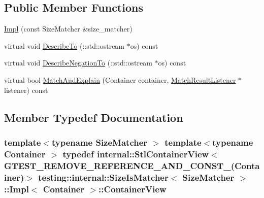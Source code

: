 \subsection*{Public Member Functions}
\begin{DoxyCompactItemize}
\item 
\hyperlink{classtesting_1_1internal_1_1_size_is_matcher_1_1_impl_aa5279c8598ec8982546350fb442223f3}{Impl} (const Size\+Matcher \&size\+\_\+matcher)
\item 
virtual void \hyperlink{classtesting_1_1internal_1_1_size_is_matcher_1_1_impl_a2d09318bced4fd9adf951009d81a97ff}{Describe\+To} (\+::std\+::ostream $\ast$os) const 
\item 
virtual void \hyperlink{classtesting_1_1internal_1_1_size_is_matcher_1_1_impl_adb77690cb058ea5e2f56bb1ddcba0289}{Describe\+Negation\+To} (\+::std\+::ostream $\ast$os) const 
\item 
virtual bool \hyperlink{classtesting_1_1internal_1_1_size_is_matcher_1_1_impl_ae68cb5cb21f7c2c0026b1afdf7e74ebf}{Match\+And\+Explain} (Container container, \hyperlink{classtesting_1_1_match_result_listener}{Match\+Result\+Listener} $\ast$listener) const 
\end{DoxyCompactItemize}


\subsection{Member Typedef Documentation}
\subsubsection[{\texorpdfstring{Container\+View}{ContainerView}}]{\setlength{\rightskip}{0pt plus 5cm}template$<$typename Size\+Matcher $>$ template$<$typename Container $>$ typedef {\bf internal\+::\+Stl\+Container\+View}$<$ {\bf G\+T\+E\+S\+T\+\_\+\+R\+E\+M\+O\+V\+E\+\_\+\+R\+E\+F\+E\+R\+E\+N\+C\+E\+\_\+\+A\+N\+D\+\_\+\+C\+O\+N\+S\+T\+\_\+}(Container)$>$ {\bf testing\+::internal\+::\+Size\+Is\+Matcher}$<$ Size\+Matcher $>$\+::{\bf Impl}$<$ Container $>$\+::{\bf Container\+View}}\hypertarget{classtesting_1_1internal_1_1_size_is_matcher_1_1_impl_ae848755998eaaaa5e38366a2fc8b55e2}{}\label{classtesting_1_1internal_1_1_size_is_matcher_1_1_impl_ae848755998eaaaa5e38366a2fc8b55e2}
